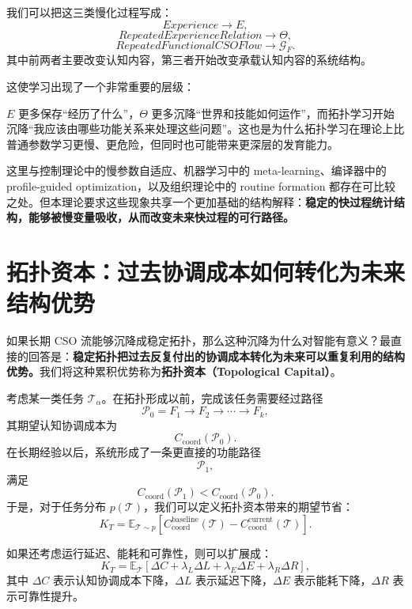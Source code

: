 我们可以把这三类慢化过程写成：
\[
Experience
\rightarrow
E,
\]
\[
RepeatedExperienceRelation
\rightarrow
\Theta,
\]
\[
RepeatedFunctionalCSOFlow
\rightarrow
\mathcal{G}_F.
\]
其中前两者主要改变认知内容，第三者开始改变承载认知内容的系统结构。

这使学习出现了一个非常重要的层级：
\begin{statementbox}
\centering
{}
\end{statementbox}
$E$ 更多保存``经历了什么''，$\Theta$ 更多沉降``世界和技能如何运作''，而拓扑学习开始沉降``我应该由哪些功能关系来处理这些问题''。这也是为什么拓扑学习在理论上比普通参数学习更慢、更危险，但同时也可能带来更深层的发育能力。

这里与控制理论中的慢参数自适应、机器学习中的 meta-learning、编译器中的 profile-guided optimization，以及组织理论中的 routine formation 都存在可比较之处。但本理论要求这些现象共享一个更加基础的结构解释：\textbf{稳定的快过程统计结构，能够被慢变量吸收，从而改变未来快过程的可行路径。}


\section{拓扑资本：过去协调成本如何转化为未来结构优势}

如果长期 CSO 流能够沉降成稳定拓扑，那么这种沉降为什么对智能有意义？最直接的回答是：\textbf{稳定拓扑把过去反复付出的协调成本转化为未来可以重复利用的结构优势。}我们将这种累积优势称为\textbf{拓扑资本（Topological Capital）}。

考虑某一类任务 $\mathcal{T}_{\alpha}$。在拓扑形成以前，完成该任务需要经过路径
\[
\mathcal{P}_{0}
=
F_1
\rightarrow
F_2
\rightarrow
\cdots
\rightarrow
F_k,
\]
其期望认知协调成本为
\[
C_{\mathrm{coord}}
(\mathcal{P}_{0}).
\]
在长期经验以后，系统形成了一条更直接的功能路径
\[
\mathcal{P}_{1},
\]
满足
\[
C_{\mathrm{coord}}
(\mathcal{P}_{1})
<
C_{\mathrm{coord}}
(\mathcal{P}_{0}).
\]
于是，对于任务分布 $p(\mathcal{T})$，我们可以定义拓扑资本带来的期望节省：
\[
K_T
=
\mathbb{E}_{\mathcal{T}\sim p}
\left[
C_{\mathrm{coord}}^{\mathrm{baseline}}(\mathcal{T})
-
C_{\mathrm{coord}}^{\mathrm{current}}(\mathcal{T})
\right].
\]

如果还考虑运行延迟、能耗和可靠性，则可以扩展成：
\[
K_T
=
\mathbb{E}_{\mathcal{T}}
\left[
\Delta C
+
\lambda_L\Delta L
+
\lambda_E\Delta E
+
\lambda_R\Delta R
\right],
\]
其中 $\Delta C$ 表示认知协调成本下降，$\Delta L$ 表示延迟下降，$\Delta E$ 表示能耗下降，$\Delta R$ 表示可靠性提升。

